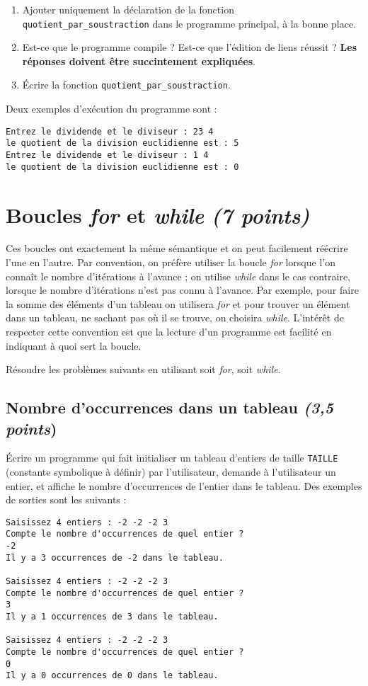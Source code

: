 \begin{enumerate}
\item Ajouter uniquement la déclaration de la fonction \verb|quotient_par_soustraction| dans le programme principal, à la bonne place.
\item Est-ce que le programme compile ? Est-ce que l'édition de liens
  réussit ? \textbf{Les réponses doivent être succintement expliquées}.
\item Écrire la fonction \verb|quotient_par_soustraction|.
\end{enumerate}

Deux exemples d'exécution du programme sont :
\begin{verbatim}
Entrez le dividende et le diviseur : 23 4
le quotient de la division euclidienne est : 5
Entrez le dividende et le diviseur : 1 4
le quotient de la division euclidienne est : 0
\end{verbatim}

\section{Boucles \emph{for} et \emph{while} \textit{(7 points)}}

Ces boucles ont exactement la même sémantique et on peut facilement
réécrire l'une en l'autre. Par convention, on préfère utiliser la
boucle \emph{for} lorsque l'on connaît le nombre d'itérations à
l'avance ; on utilise \emph{while} dans le cas contraire, lorsque le nombre
d'itérations n'est pas connu à l'avance. Par exemple, pour faire la
somme des éléments d'un tableau on utilisera \emph{for} et pour
trouver un élément dans un tableau, ne sachant pas où il se trouve, on
choisira \emph{while}. L'intérêt de respecter cette convention est
que la lecture d'un programme est facilité en indiquant à quoi sert la
boucle.

Résoudre les problèmes suivants en utilisant soit \emph{for}, soit \emph{while}.

\subsection{Nombre d'occurrences dans un tableau \textit{(3,5 points})}

Écrire un programme qui fait initialiser un tableau d'entiers de taille \verb|TAILLE| (constante symbolique à définir) par l'utilisateur, demande à l'utilisateur un entier, et affiche le nombre d'occurrences de l'entier dans le tableau. Des exemples de sorties sont les suivants :
\begin{verbatim}
Saisissez 4 entiers : -2 -2 -2 3
Compte le nombre d'occurrences de quel entier ?
-2
Il y a 3 occurrences de -2 dans le tableau.

Saisissez 4 entiers : -2 -2 -2 3
Compte le nombre d'occurrences de quel entier ?
3
Il y a 1 occurrences de 3 dans le tableau.

Saisissez 4 entiers : -2 -2 -2 3
Compte le nombre d'occurrences de quel entier ?
0
Il y a 0 occurrences de 0 dans le tableau.
\end{verbatim}

